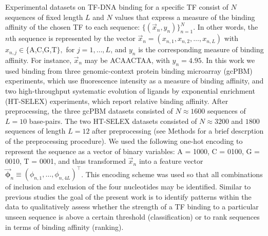 \documentclass[aps,pra,groupedaddress,nofootinbib,notitlepage,showpacs,floatfix,superscriptaddress]{revtex4-1}
\begin{document}
Experimental datasets on TF-DNA binding for a specific TF consist of $N$ sequences of fixed length $L$ and $N$ values that express a measure of the binding affinity of the chosen TF to each sequence: $\{(\vec{x}_n,y_n)\}_{n=1}^N$. In other words, the $n$th sequence is represented by the vector $\vec{x}_n = (x_{n,1},x_{n,2},\dotsc,x_{n,L})$ with $x_{n,j} \in \{$A,C,G,T$\},$ for $j = 1, \dotsc, L$, and $y_n$ is the corresponding measure of binding affinity. For instance, $\vec{x}_n$ may be ACAACTAA, with $y_n = 4.95$. {In this work we used binding from three genomic-context protein binding microarray (gcPBM) experiments, which use fluorescence intensity as a measure of binding affinity, \cite{Gordan:13} and two high-throughput systematic evolution of ligands by exponential enrichment (HT-SELEX) \cite{Jolma:10, Jolma:13, Liu:05} experiments, which report relative binding affinity. After preprocessing, the three gcPBM datasets consisted of $N\approx 1600$ sequences of $L=10$ base-pairs. The two HT-SELEX datasets consisted of $N\approx 3200$ and $1800$ sequences of length $L=12$ after preprocessing (see Methods for a brief descrption of the preprocessing procedure).} We used the following one-hot encoding to represent the sequence as a vector of binary variables: A = 1000, C = 0100, G = 0010, T = 0001, and thus transformed $\vec{x}_n$ into a feature vector $\vec{\bm{\phi}}_n \equiv (\phi_{n,1},\dotsc, \phi_{n,4L})^{\intercal}$. This encoding scheme \cite{Zhou:15} was used so that all combinations of inclusion and exclusion of the four nucleotides may be identified. Similar to previous studies \cite{Yang:14, Zhou:15, Abe:15, Yang:17} the goal of the present work is to identify patterns within the data to qualitatively assess whether the strength of a TF binding to a particular unseen sequence is above a certain threshold (classification) or to rank sequences in terms of binding affinity (ranking).
\end{document}
